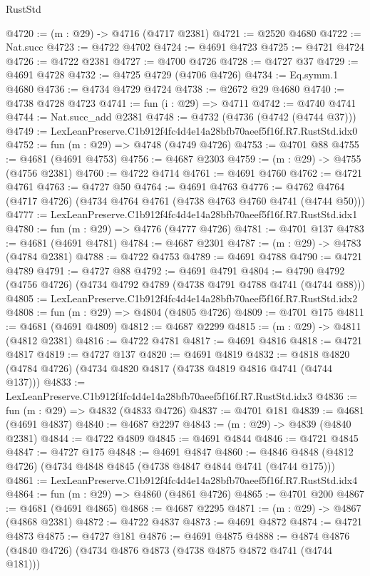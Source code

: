 \begin{lexlean}{RustStd}
\begin{coremodule}
@4720 := (m : @29) -> @4716 (@4717 @2381)
@4721 := @2520 @4680
@4722 := Nat.succ
@4723 := @4722 @4702
@4724 := @4691 @4723
@4725 := @4721 @4724
@4726 := @4722 @2381
@4727 := @4700 @4726
@4728 := @4727 @37
@4729 := @4691 @4728
@4732 := @4725 @4729 (@4706 @4726)
@4734 := Eq.symm.{1} @4680
@4736 := @4734 @4729 @4724
@4738 := @2672 @29 @4680
@4740 := @4738 @4728 @4723
@4741 := fun (i : @29) => @4711
@4742 := @4740 @4741
@4744 := Nat.succ_add @2381
@4748 := @4732 (@4736 (@4742 (@4744 @37)))
@4749 := LexLeanPreserve.C1b912f4fc4d4e14a28bfb70aeef5f16f.R7.RustStd.idx0
@4752 := fun (m : @29) => @4748 (@4749 @4726)
@4753 := @4701 @88
@4755 := @4681 (@4691 @4753)
@4756 := @4687 @2303
@4759 := (m : @29) -> @4755 (@4756 @2381)
@4760 := @4722 @4714
@4761 := @4691 @4760
@4762 := @4721 @4761
@4763 := @4727 @50
@4764 := @4691 @4763
@4776 := @4762 @4764 (@4717 @4726) (@4734 @4764 @4761 (@4738 @4763 @4760 @4741 (@4744 @50)))
@4777 := LexLeanPreserve.C1b912f4fc4d4e14a28bfb70aeef5f16f.R7.RustStd.idx1
@4780 := fun (m : @29) => @4776 (@4777 @4726)
@4781 := @4701 @137
@4783 := @4681 (@4691 @4781)
@4784 := @4687 @2301
@4787 := (m : @29) -> @4783 (@4784 @2381)
@4788 := @4722 @4753
@4789 := @4691 @4788
@4790 := @4721 @4789
@4791 := @4727 @88
@4792 := @4691 @4791
@4804 := @4790 @4792 (@4756 @4726) (@4734 @4792 @4789 (@4738 @4791 @4788 @4741 (@4744 @88)))
@4805 := LexLeanPreserve.C1b912f4fc4d4e14a28bfb70aeef5f16f.R7.RustStd.idx2
@4808 := fun (m : @29) => @4804 (@4805 @4726)
@4809 := @4701 @175
@4811 := @4681 (@4691 @4809)
@4812 := @4687 @2299
@4815 := (m : @29) -> @4811 (@4812 @2381)
@4816 := @4722 @4781
@4817 := @4691 @4816
@4818 := @4721 @4817
@4819 := @4727 @137
@4820 := @4691 @4819
@4832 := @4818 @4820 (@4784 @4726) (@4734 @4820 @4817 (@4738 @4819 @4816 @4741 (@4744 @137)))
@4833 := LexLeanPreserve.C1b912f4fc4d4e14a28bfb70aeef5f16f.R7.RustStd.idx3
@4836 := fun (m : @29) => @4832 (@4833 @4726)
@4837 := @4701 @181
@4839 := @4681 (@4691 @4837)
@4840 := @4687 @2297
@4843 := (m : @29) -> @4839 (@4840 @2381)
@4844 := @4722 @4809
@4845 := @4691 @4844
@4846 := @4721 @4845
@4847 := @4727 @175
@4848 := @4691 @4847
@4860 := @4846 @4848 (@4812 @4726) (@4734 @4848 @4845 (@4738 @4847 @4844 @4741 (@4744 @175)))
@4861 := LexLeanPreserve.C1b912f4fc4d4e14a28bfb70aeef5f16f.R7.RustStd.idx4
@4864 := fun (m : @29) => @4860 (@4861 @4726)
@4865 := @4701 @200
@4867 := @4681 (@4691 @4865)
@4868 := @4687 @2295
@4871 := (m : @29) -> @4867 (@4868 @2381)
@4872 := @4722 @4837
@4873 := @4691 @4872
@4874 := @4721 @4873
@4875 := @4727 @181
@4876 := @4691 @4875
@4888 := @4874 @4876 (@4840 @4726) (@4734 @4876 @4873 (@4738 @4875 @4872 @4741 (@4744 @181)))

\end{coremodule}
\end{lexlean}
